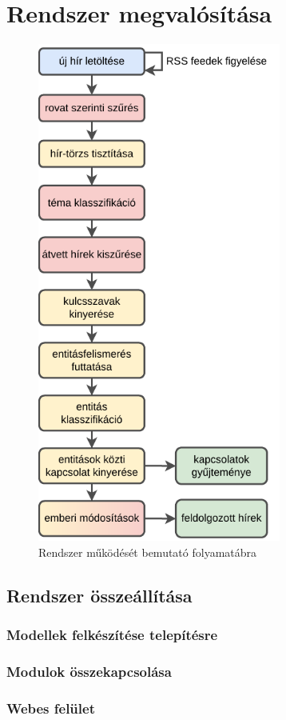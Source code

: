 \chapter{Rendszer megvalósítása}

\begin{figure}[H]
	\centering
	\includegraphics[width=80mm,keepaspectratio]{figures/flowchart-konkret.pdf}
	\caption{Rendszer működését bemutató folyamatábra}
\end{figure}

\section{Rendszer összeállítása}

\subsection{Modellek felkészítése telepítésre}

\subsection{Modulok összekapcsolása}

\subsection{Webes felület}
